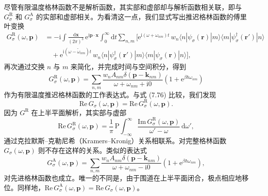尽管有限温度格林函数不是解析函数，其实部和虚部却与解析函数相关联，即与 $G_{\sigma}^{\mathrm{R}}$ 和 $G_{\sigma}^{\mathrm{A}}$ 的实部和虚部相关。为看清这一点，我们显式写出推迟格林函数的傅里叶变换
\begin{equation*}
\begin{aligned}
G_{\sigma}^{\mathrm{R}}(\omega,\mathbf{p})&=-\mathrm{i}\int\frac{\mathrm{d}\mathbf{x}}{(2\pi)^{3}}\,\mathrm{e}^{\mathrm{i}\mathbf{p}\cdot\mathbf{x}}\int_{0}^{\infty}\mathrm{d}t\sum_{n,m}\Big[\mathrm{e}^{\mathrm{i}(\omega+\omega_{nm})t}\,w_{n}\langle n|\psi_{\sigma}(\mathbf{r})|m\rangle\langle m|\psi_{\sigma}^{\dagger}(\mathbf{r}')|n\rangle\\
&\quad+\mathrm{e}^{\mathrm{i}(\omega-\tilde{\omega}_{nm})t}\,w_{n}\langle n|\psi_{\sigma}^{\dagger}(\mathbf{r}')|m\rangle\langle m|\psi_{\sigma}(\mathbf{r})|n\rangle\Big],
\end{aligned}\tag{7.77}
\end{equation*}
再次通过交换 $n$ 与 $m$ 来简化，并完成时间与空间积分，得到
\begin{equation*}
G_{\sigma}^{\mathrm{R}}(\omega,\mathbf{p})=\sum_{n,m}\frac{w_{n}A_{nm}\delta(\mathbf{p}-\mathbf{k}_{nm})}{\omega+\omega_{nm}+\mathrm{i}0}\left(1+\mathrm{e}^{\beta\hbar\omega_{nm}}\right)\tag{7.78}
\end{equation*}
作为有限温度推迟格林函数的工作表达式。与式 (7.76) 比较，我们发现
\begin{equation*}
\mathrm{Re}\,G_{\sigma}(\omega,\mathbf{p})=\mathrm{Re}\,G_{\sigma}^{\mathrm{R}}(\omega,\mathbf{p}).\tag{7.79}
\end{equation*}
因为 $G^{\mathrm{R}}$ 在上半平面解析，其实部与虚部
\begin{equation*}
\mathrm{Re}\,G_{\sigma}^{\mathrm{R}}(\omega,\mathbf{p})=\frac{1}{\pi}\,\mathrm{P}\int_{-\infty}^{\infty}\frac{\mathrm{Im}\,G_{\sigma}^{\mathrm{R}}(\omega,\mathbf{p})}{\omega'-\omega}\,\mathrm{d}\omega',\tag{7.80}
\end{equation*}
通过克拉默斯–克勒尼希（Kramers–Kronig）关系相联系。对完整格林函数 $G_{\sigma}(\omega,\mathbf{p})$ 则不存在这样的关系。类似的表达式
\begin{equation*}
G_{\sigma}^{\mathrm{A}}(\omega,\mathbf{p})=\sum_{n,m}\frac{w_{n}A_{nm}\delta(\mathbf{p}-\mathbf{k}_{nm})}{\omega+\omega_{nm}-\mathrm{i}0}\left(1+\mathrm{e}^{\beta\hbar\omega_{nm}}\right),\tag{7.81}
\end{equation*}
对先进格林函数也成立。唯一的不同是，由于围道在上半平面闭合，极点相应地移位。同样地，$\mathrm{Re}\,G_{\sigma}^{\mathrm{A}}(\omega,\mathbf{p})=\mathrm{Re}\,G_{\sigma}(\omega,\mathbf{p})$。

